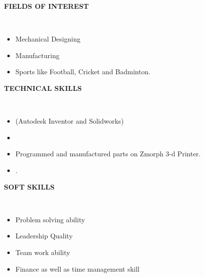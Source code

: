 \documentclass[a4paper,10pt]{article}
\newcommand{\lsep}{-0.5cm}
\newcommand{\resheading}[1]{{\small \colorbox{mygrey}{\begin{minipage}{0.975\textwidth}{\textbf{#1 \vphantom{p\^{E}}}}\end{minipage}}}}
\begin{document}
\resheading{\textbf{\Large{FIELDS OF INTEREST}}}\\[\lsep]
\begin{itemize}
\item \noindent Mechanical Designing
\item \noindent Manufacturing
\item \noindent Sports like Football, Cricket and Badminton.
\end{itemize}

\resheading{\textbf{\Large{TECHNICAL SKILLS}}}\\[\lsep]
\begin{itemize}
\item {} (Autodesk Inventor and Solidworks)
\item {}
\item \noindent Programmed and manufactured parts on Zmorph 3-d Printer.
\item {}.
\end{itemize}

\resheading{\textbf{\Large{SOFT SKILLS}}}\\[\lsep]
\begin{itemize}
\item \noindent Problem solving ability
\item \noindent Leadership Quality
\item \noindent Team work ability
\item \noindent Finance as well as time management skill
\end{itemize}
\end{document}
